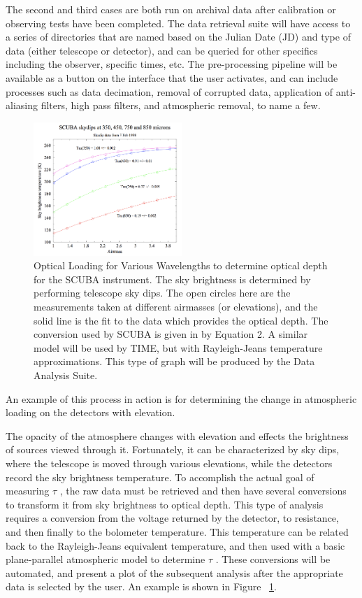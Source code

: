 \documentclass[manuscript]{aastex}
\begin{document}
The second and third cases are both run on archival data after calibration or observing tests have been completed. The data retrieval suite will have access to a series of directories that are named based on the Julian Date (JD) and type of data (either telescope or detector), and can be queried for other specifics including the observer, specific times, etc. The pre-processing pipeline will be available as a button on the interface that the user activates, and can include processes such as data decimation, removal of corrupted data, application of anti-aliasing filters, high pass filters, and atmospheric removal, to name a few. 
\begin{figure}
\vspace{-0.8cm}
  \begin{center}
    \includegraphics[width=0.5\textwidth]{tau.png}
   \end{center}
\caption[SCUBA Optical Loading Skydips -(\cite{Archibald2002})]{Optical Loading for Various Wavelengths to determine optical depth for the SCUBA instrument. The sky brightness is determined by performing telescope sky dips. The open circles here are the measurements taken at different airmasses (or elevations), and the solid line is the fit to the data which provides the optical depth. The conversion used by SCUBA is given in \cite{Archibald2002} by Equation 2. A similar model will be used by TIME, but with Rayleigh-Jeans temperature approximations. This type of graph will be produced by the Data Analysis Suite.}
\label{fig:tau}
\end{figure}
An example of this process in action is for determining the change in atmospheric loading on the detectors with elevation. 

The opacity of the atmosphere changes with elevation and effects the brightness of sources viewed through it. Fortunately, it can be characterized by sky dips, where the telescope is moved through various elevations, while the detectors record the sky brightness temperature. To accomplish the actual goal of measuring \(\tau \) , the raw data must be retrieved and then have several conversions to transform it from sky brightness to optical depth. This type of analysis requires a conversion from the voltage returned by the detector, to resistance, and then finally to the bolometer temperature. This temperature can be related back to the Rayleigh-Jeans equivalent temperature, and then used with a basic plane-parallel atmospheric model to determine \(\tau\) . These conversions will be automated, and present a plot of the subsequent analysis after the appropriate data is selected by the user. An example is shown in Figure ~\ref{fig:tau}.
\end{document}
